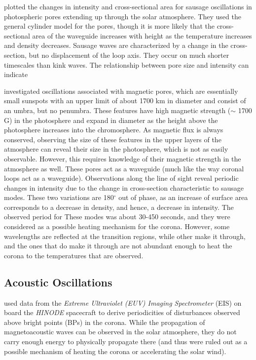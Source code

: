 \documentclass[preprint2]{aastex}
\begin{document}
\cite{sausage_1} plotted the changes in intensity and cross-sectional
area for sausage oscillations in photospheric pores extending up
through the solar atmosphere. They used the general cylinder model for
the pores, though it is more likely that the cross-sectional area of
the waveguide increases with height as the temperature increases and
density decreases.
Sausage waves are characterized by a change in the cross-section,
but no displacement of the loop axis. They occur on much shorter
timescales than kink waves.
The relationship between pore size and intensity can
indicate

\cite{sausage_2} investigated oscillations associated with magnetic
pores, which are essentially small sunspots with an upper limit of
about 1700 km in diameter and consist of an umbra, but no penumbra.
These features have high magnetic strength
($\sim$ 1700 G) in the photosphere and expand in diameter as the
height above the
photosphere increases into the chromosphere. As magnetic flux is
always conserved, observing the size of these features in the upper
layers of the atmosphere can reveal their size in the photosphere,
which is not as easily observable. However, this requires knowledge
of their magnetic strength in the atmosphere as well.
These pores act as a waveguide (much like the way coronal loops act
as a waveguide). Observations along the line of sight reveal periodic
changes in intensity due to the change in cross-section characteristic
to sausage modes. These two variations are 180$^{\circ}$ out of phase,
as an increase of surface area corresponds to a decrease in density,
and hence, a decrease in intensity. The observed period for These modes
was about 30-450 seconds, and they were considered as a
possible heating mechanism for the corona. However, some wavelengths are
reflected at the transition regions, while other make it through,
and the ones that do make it through are not abundant enough to heat
the corona to the temperatures that are observed.
\subsection{Acoustic Oscillations}

\cite{acoustic_2} used data from the
\emph{Extreme Ultraviolet (EUV) Imaging Spectrometer} (EIS) on board the
\emph{HINODE} spacecraft to derive periodicities of disturbances
observed above bright points (BPs) in the corona.
While the propagation of magnetoacoustic waves can be observed
in the solar atmosphere, they do not carry enough energy to physically
propagate there (and thus were ruled out as a possible mechanism of
heating the corona or accelerating the solar wind).
\end{document}
